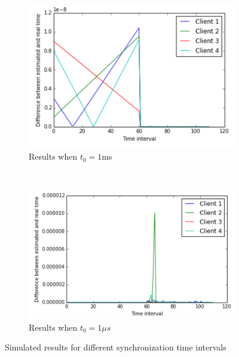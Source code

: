 \documentclass[10pt, journal, letter, onecolumn]{IEEEtran}
\begin{document}
\begin{figure}[h]
\begin{subfigure}[b]{0.45\textwidth}
\centering
\includegraphics[scale=0.5]{figures/figure3}
\caption{Results when $t_0 = 1$ms}
\label{fig:results1_1ms}
\end{subfigure}~
\begin{subfigure}[b]{0.45\textwidth}
\centering
\includegraphics[scale=0.5]{figures/figure4}
\caption{Results when  $t_0 = 1 \mu s$}
\label{fig:results1_1mus}
\end{subfigure}
\caption{Simulated results for different synchronization time intervals}
\label{fig:results1}
\end{figure}
\end{document}
